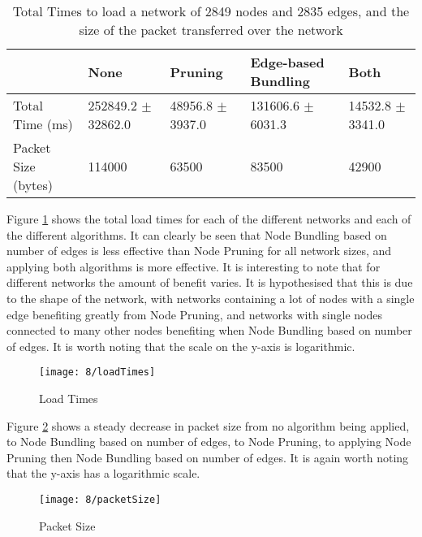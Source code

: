 \documentclass[../dissertation.tex]{subfiles}
\begin{document}
\begin{table}[H]
\centering
\setlength{\tabcolsep}{0.4em}
\begin{tabular}{|l|l|l|l|l|}
\hline
                    & \textbf{None}          & \textbf{Pruning}     & \textbf{Edge-based Bundling}         & \textbf{Both}        \\ \hline
Total Time (ms)     & 252849.2 $\pm$ 32862.0 & 48956.8 $\pm$ 3937.0 & 131606.6 $\pm$ 6031.3 & 14532.8 $\pm$ 3341.0 \\ \hline
Packet Size (bytes) & 114000                 & 63500                & 83500                 & 42900                \\ \hline
\end{tabular}
\caption{Total Times to load a network of 2849 nodes and 2835 edges, and the size of the packet transferred over the network}
\label{table:3000-nodes}
\end{table}

Figure \ref{fig:loadTimes} shows the total load times for each of the different networks and each of the different algorithms. It can clearly be seen that Node Bundling based on number of edges is less effective than Node Pruning for all network sizes, and applying both algorithms is more effective. It is interesting to note that for different networks the amount of benefit varies. It is hypothesised that this is due to the shape of the network, with networks containing a lot of nodes with a single edge benefiting greatly from Node Pruning, and networks with single nodes connected to many other nodes benefiting when Node Bundling based on number of edges. It is worth noting that the scale on the y-axis is logarithmic.

\begin{figure}[H]
    \centering
    \texttt{[image: 8/loadTimes]}
    \caption{Load Times}
    \label{fig:loadTimes}
\end{figure}

Figure \ref{fig:packetSize} shows a steady decrease in packet size from no algorithm being applied, to Node Bundling based on number of edges, to Node Pruning, to applying Node Pruning then Node Bundling based on number of edges. It is again worth noting that the y-axis has a logarithmic scale.

\begin{figure}[H]
    \centering
    \texttt{[image: 8/packetSize]}
    \caption{Packet Size}
    \label{fig:packetSize}
\end{figure}
\end{document}
